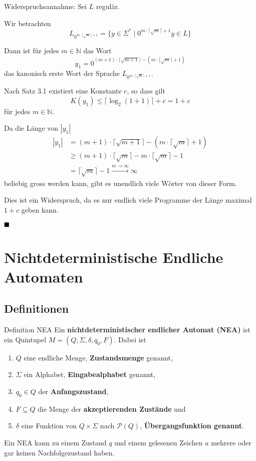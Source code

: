 \documentclass[a4paper, 11pt]{article}
\def\N{\mathbb{N}}
\begin{document}
    Widerspruchsannahme: Sei $L$ regulär.

   Wir betrachten $$L_{0^{m\cdot \lceil \sqrt{m}\rceil + 1}} = \{y \in \Sigma^* \mid 0^{m\cdot \lceil \sqrt{m}\rceil + 1}y \in L\}$$

   Dann ist für jedes $m \in \N$ das Wort $$y_1 = 0^{(m+1)\cdot \lceil \sqrt{m+1}\rceil - (m\cdot \lceil \sqrt{m}\rceil + 1)}$$
   das kanonisch erste Wort der Sprache $L_{0^{m\cdot \lceil \sqrt{m}\rceil + 1}}$.

    Nach Satz 3.1 existiert eine Konstante $c$, so dass gilt
    $$K(y_1) \leq \lceil\log_2(1+1)\rceil + c = 1 + c$$
    für jedes $m \in \N$.

    Da die Länge von $|y_1|$
    \begin{align*}
        |y_1| &= (m+1)\cdot \lceil \sqrt{m+1}\rceil - (m\cdot \lceil \sqrt{m}\rceil + 1)\\
             &\geq (m+1) \cdot  \lceil \sqrt{m}\rceil -m\cdot \lceil \sqrt{m}\rceil -1\\
             &= \lceil \sqrt{m}\rceil -1 \overset{m \to \infty}{\longrightarrow} \infty
    \end{align*}
    beliebig gross werden kann, gibt es unendlich viele Wörter von dieser Form.

    Dies ist ein Widerspruch, da es nur endlich viele Programme der Länge maximal $1+c$ geben kann.

    $\hfill\blacksquare$


\section{Nichtdeterministische Endliche Automaten}

\subsection{Definitionen}
    \begin{mainbox}{Definition NEA}
        Ein \textbf{nichtdeterministischer endlicher Automat (NEA)} ist ein Quintupel $M = (Q, \Sigma, \delta, q_0, F)$. Dabei ist 
        \begin{enumerate}[label= (\roman*)]
            \item $Q$ eine endliche Menge, \textbf{Zustandsmenge} genannt,
            \item $\Sigma$ ein Alphabet, \textbf{Eingabealphabet} genannt,
            \item $q_0 \in Q$ der \textbf{Anfangszustand},
            \item $F \subseteq Q$ die Menge der \textbf{akzeptierenden Zustände} und 
            \item $\delta$ eine Funktion von $Q \times \Sigma$ nach $\mathcal{P}(Q)$, \textbf{Übergangsfunktion genannt}.
        \end{enumerate}
    \end{mainbox}
    Ein NEA kann zu einem Zustand $q$ und einem gelesenen Zeichen $a$ mehrere oder gar keinen Nachfolgezustand haben.
\end{document}
